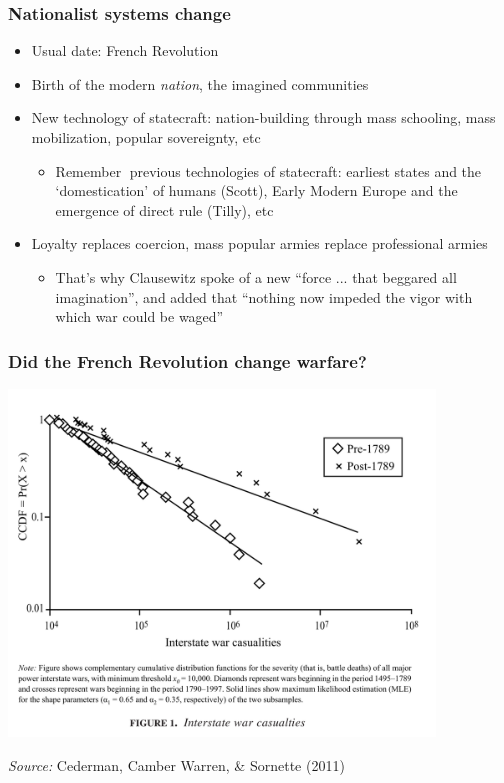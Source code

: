 \documentclass[utf8, xcolor=dvipsnames]{beamer}
\begin{document}
\begin{frame}
\frametitle{Nationalist systems change}
\centering

\begin{itemize}[<+->]
  \item Usual date: French Revolution
  \item Birth of the modern \textit{nation}, the imagined communities
  \item New technology of statecraft: nation-building through mass schooling, mass mobilization, popular sovereignty, etc
  \begin{itemize}
    \item Remember previous technologies of statecraft: earliest states and the `domestication' of humans (Scott), Early Modern Europe and the emergence of direct rule (Tilly), etc
  \end{itemize}
  \item Loyalty replaces coercion, mass popular armies replace professional armies
  \begin{itemize}
    \item That's why Clausewitz spoke of a new ``force ... that beggared all imagination'', and added that ``nothing now impeded the vigor with which war could be waged''
  \end{itemize}
\end{itemize}

\end{frame}

\begin{frame}
\frametitle{Did the French Revolution change warfare?}
\centering

\includegraphics[width = 0.85\textwidth]{img/cederman_et_al_fig1}

{\scriptsize \textit{Source:} Cederman, Camber Warren, \& Sornette (2011)}

\end{frame}
\end{document}
